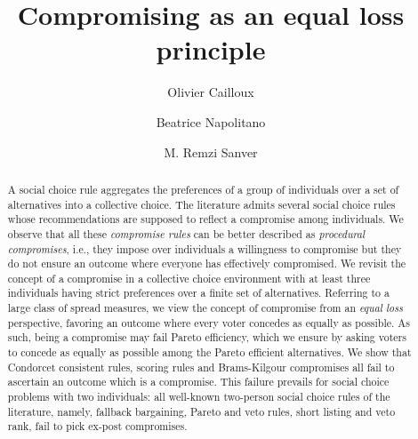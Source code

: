 \documentclass[version=3.21, pagesize, twoside=off, bibliography=totoc, DIV=calc, fontsize=12pt, a4paper]{scrartcl}
\title{Compromising as an equal loss principle}
\author{Olivier Cailloux}
\author{Beatrice Napolitano}
\author{M. Remzi Sanver}
\affil{Université Paris-Dauphine, Université PSL, CNRS, LAMSADE\\
	name.lastname@dauphine.fr
}
\begin{document}
\maketitle

\begin{abstract}
	A social choice rule aggregates the preferences of a group of individuals over a set of alternatives into a collective choice. The literature admits several social choice rules whose recommendations are supposed to reflect a compromise among individuals. We observe that all these \emph{compromise rules}   can be better described as \emph{procedural compromises}, i.e., they impose over individuals a willingness to compromise but they do not ensure an outcome where everyone has effectively compromised. We revisit the concept of a compromise in a collective choice environment with at least three individuals having strict preferences over a finite set of alternatives. Referring to a large class of spread measures, we view the concept of compromise from an \emph{equal loss} perspective, favoring an outcome where every voter concedes as equally as possible. As such, being a compromise may fail Pareto efficiency, which we ensure by asking voters to concede as equally as possible among the Pareto efficient alternatives. We show that Condorcet consistent rules, scoring rules and Brams-Kilgour compromises all fail to ascertain an outcome which is a compromise. This failure prevails for social choice problems with two individuals: all well-known two-person social choice rules of the literature, namely, fallback bargaining, Pareto and veto rules, short listing and veto rank, fail to pick ex-post compromises. 
\end{abstract}
\end{document}

